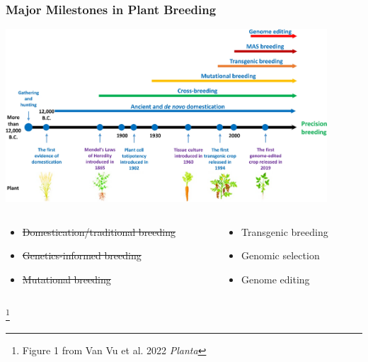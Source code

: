 \documentclass[xcolor=dvipsnames]{beamer}
\newcommand\blfootnote[1]{%
	\begingroup
	\renewcommand\thefootnote{}\footnote{#1}%
	\addtocounter{footnote}{-1}%
	\endgroup
}
\begin{document}
\begin{frame}
	\frametitle{Major Milestones in Plant Breeding}
	\centering	\includegraphics[keepaspectratio, width  = 0.9\textwidth]{img/timeLine}
	
	
	\begin{columns}
		\begin{column}{0.5\textwidth}
			\begin{itemize}
				\item[\textbf{1}] \st{Domestication/traditional breeding}
				\item[\textbf{2}] \st{Genetics-informed breeding}
				\item[\textbf{3}] \st{Mutational breeding}
			\end{itemize}
		\end{column}
		\begin{column}{0.5\textwidth}
			\begin{itemize}
				\item[\textbf{4}] Transgenic breeding
				\item[\textbf{5}] Genomic selection
				\item[\textbf{6}] Genome editing
			\end{itemize}
		\end{column}
	\end{columns}
	
	\blfootnote{Figure 1 from Van Vu et al. 2022 \textit{Planta}}
	
	
	
\end{frame}
\end{document}
